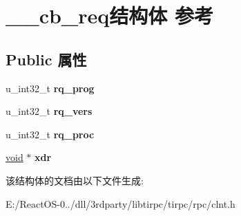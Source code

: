 \hypertarget{struct____cb__req}{}\section{\+\_\+\+\_\+cb\+\_\+req结构体 参考}
\label{struct____cb__req}
\subsection*{Public 属性}
\begin{DoxyCompactItemize}
\item 
\mbox{\label{struct____cb__req_acf1dcd4e0e7bd7add2ae0715e0d7d620}} 
u\+\_\+int32\+\_\+t {\bfseries rq\+\_\+prog}
\item 
\mbox{\label{struct____cb__req_a8f379b320bb6c7a6996873bfede20f70}} 
u\+\_\+int32\+\_\+t {\bfseries rq\+\_\+vers}
\item 
\mbox{\label{struct____cb__req_a937530a67fe8132f16c02ee1f8b8f711}} 
u\+\_\+int32\+\_\+t {\bfseries rq\+\_\+proc}
\item 
\mbox{\label{struct____cb__req_ab9eb1e885a723d03efac07458a2bd8e1}} 
\hyperlink{interfacevoid}{void} $\ast$ {\bfseries xdr}
\end{DoxyCompactItemize}


该结构体的文档由以下文件生成\+:\begin{DoxyCompactItemize}
\item 
E\+:/\+React\+O\+S-\/0../dll/3rdparty/libtirpc/tirpc/rpc/clnt.\+h\end{DoxyCompactItemize}
